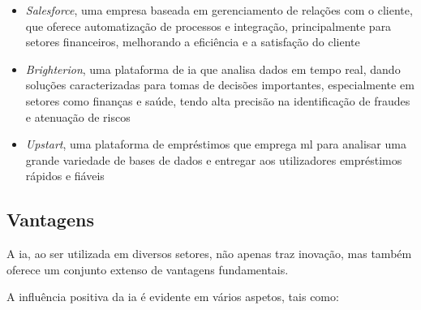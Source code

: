 \documentclass{report}
\begin{document}
\begin{itemize}
	\item \textit{Salesforce}, uma empresa baseada em gerenciamento de relações com o cliente, que oferece automatização de processos e integração, principalmente para setores financeiros, melhorando a eficiência e a satisfação do cliente
	\item \textit{Brighterion}, uma plataforma de \ac{ia} que analisa dados em tempo real, dando soluções caracterizadas para tomas de decisões importantes, especialmente em setores como finanças e saúde, tendo alta precisão na identificação de fraudes e atenuação de riscos
	\item \textit{Upstart}, uma plataforma de empréstimos que emprega \ac{ml} para analisar uma grande variedade de bases de dados e entregar aos utilizadores empréstimos rápidos e fiáveis
\end{itemize}

\subsection{Vantagens}
\label{subsec.vantagens}

	A \ac{ia}, ao ser utilizada em diversos setores, não apenas traz inovação, mas também oferece um conjunto extenso de vantagens fundamentais. 

	A influência positiva da \ac{ia} é evidente em vários aspetos, tais como:
\end{document}
